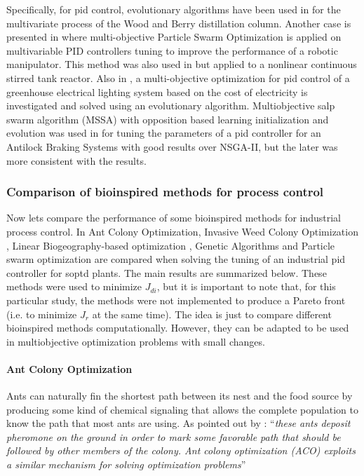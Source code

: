 Specifically, for \gls{pid} control, evolutionary algorithms have been used in \citet{Reynoso-Meza2012b} for the multivariate process of the Wood and Berry distillation column. Another case is presented in \citet{Pierezan2014} where multi-objective Particle Swarm Optimization is applied on multivariable PID controllers tuning to improve the performance of a robotic manipulator. This method was also used in \citet{Tian2014} but applied to a nonlinear continuous stirred tank reactor. Also in \citet{Mahdavian2014}, a multi-objective optimization for \gls{pid} control of a greenhouse electrical lighting system based on the cost of electricity is investigated and solved using an evolutionary algorithm. Multiobjective salp swarm algorithm (MSSA) with opposition based learning initialization and evolution was used in \citet{Domingues2019} for tuning the parameters of a \gls{pid} controller for an Antilock Braking Systems with good results over NSGA-II, but the later was more consistent with the results.

\subsubsection{Comparison of bioinspired methods for process control}
%
Now lets compare the performance of some bioinspired methods for industrial process control. In \citet{Cespedes2016} Ant Colony Optimization, Invasive Weed Colony Optimization \citep{Mehrabian2006}, Linear Biogeography-based optimization \citep{Simon2008}, Genetic Algorithms and Particle swarm optimization are compared when solving the tuning of an industrial \gls{pid} controller for \gls{soptd} plants. The main results are summarized below. These methods were used to minimize $J_{di}$, but it is important to note that, for this particular study, the methods were not implemented to produce a Pareto front (i.e. to minimize $J_r$ at the same time). The idea is just to compare different bioinspired methods computationally. However, they can be adapted to be used in multiobjective optimization problems with small changes.

\paragraph{Ant Colony Optimization}
\label{sec:ACO}
Ants can naturally fin the shortest path between its nest and the food source by producing some kind of chemical signaling that allows the complete population to know the path that most ants are using.  As pointed out by \citet{Dorigo2006}: ``\textit{these  ants  deposit pheromone  on  the  ground  in  order  to  mark  some  favorable path that should be followed by other members of the colony. Ant colony optimization (ACO) exploits a similar mechanism for solving optimization problems}''

